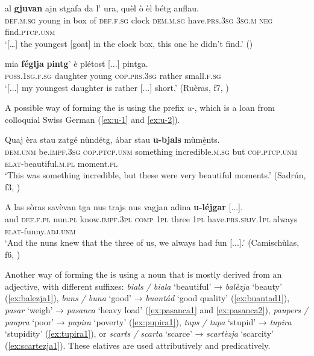 \ea\label{ex:supwithout3}
\gll    […] al \textbf{gjuvan} ajn stgafa da l' ura, quèl ò èl bétg anflau.\\
  {} \textsc{def.m.sg} young in box of \textsc{def.f.sg} clock \textsc{dem.m.sg} have.\textsc{prs.3sg} \textsc{3sg.m} \textsc{neg} find.\textsc{ptcp.unm}\\
\glt `[…] the youngest [goat] in the clock box, this one he didn’t find.' (\citealt[61]{Gartner1910})
\z

\ea\label{ex:supwithout4}
\gll  [...] mia \textbf{féglja} \textbf{pintg}’ è plétost [...] pintga.   \\
{} \textsc{poss.1sg.f.sg} daughter young \textsc{cop.prs.3sg} rather {} small.\textsc{f.sg}\\
\glt `[...] my youngest daughter is rather [...] short.' (Ruèras, f7, )
\z

A possible way of forming the  is using the prefix \textit{u-}, which is a loan from colloquial Swiss German (\ref{ex:u-1} and \ref{ex:u-2}).

\ea\label{ex:u-1}
\gll  Quaj èra stau zatgé nùndétg, ábar stau \textbf{u-bjals} mùm{\`e̱}nts.\\
\textsc{dem.unm} be.\textsc{impf.3sg} \textsc{cop.ptcp.unm} something incredible.\textsc{m.sg} but \textsc{cop.ptcp.unm}  \textsc{elat}-beautiful.\textsc{m.pl} moment.\textsc{pl} \\
\glt `This was something incredible, but these were very beautiful moments.' (Sadrún, f3, )
\z

\ea\label{ex:u-2}
\gll    A las sòras savèvan tga nus trajs nus vagjan adina \textbf{u-léjgar} [...].\\
and \textsc{def.f.pl} nun.\textsc{pl} know.\textsc{impf.3pl} \textsc{comp} \textsc{1pl} three \textsc{1pl} have.\textsc{prs.sbjv.1pl} always \textsc{elat}-funny.\textsc{adj.unm}\\
\glt `And the nuns knew that the three of us, we always had fun [...].' (Camischùlas, f6, )
\z

Another way of forming the  is using a noun that is mostly derived from an adjective, with different suffixes: \textit{bials / biala} `beautiful' → \textit{balèzja} `beauty' (\ref{ex:balezja1}), \textit{buns / buna} `good' → \textit{buantád} `good quality' (\ref{ex:buantad1}), \textit{pasar} `weigh' → \textit{pasanca} `heavy load' (\ref{ex:pasanca1} and \ref{ex:pasanca2}), \textit{paupers / paupra} `poor' → \textit{pupira} `poverty' (\ref{ex:pupira1}), \textit{tups / tupa} `stupid' → \textit{tupira}  `stupidity' (\ref{ex:tupira1}), or \textit{scarts / scarta} `scarce' → \textit{scartèzja} `scarcity' (\ref{ex:scartezja1}). These elatives are used attributively and predicatively.

